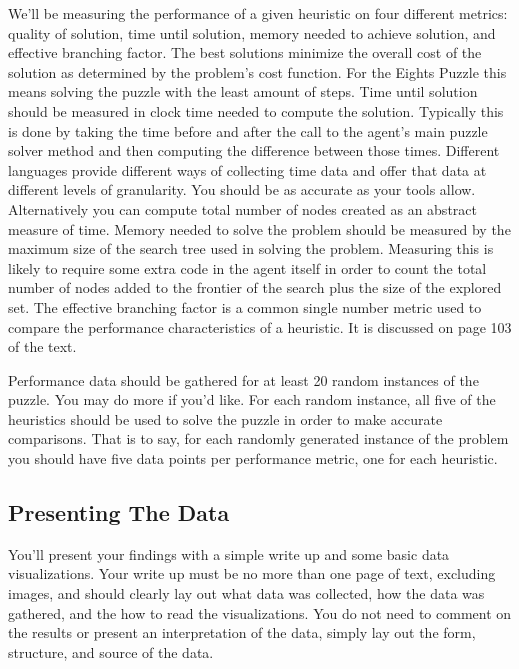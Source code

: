 \documentclass[nobib]{tufte-handout}
\begin{document}
We'll be measuring the performance of a given heuristic on four different metrics: quality of solution, time until solution, memory needed to achieve solution, and effective branching factor.  The best solutions minimize the overall cost of the solution as determined by the problem's cost function.  For the Eights Puzzle this means solving the puzzle with the least amount of steps. Time until solution should be measured in clock time needed to compute the solution. Typically this is done by taking the time before and after the call to the agent's main puzzle solver method and then computing the difference between those times. Different languages provide different ways of collecting time data and offer that data at different levels of granularity. You should be as accurate as your tools allow. Alternatively you can compute total number of nodes created as an abstract measure of time. Memory needed to solve the problem should be measured by the maximum size of the search tree used in solving the problem. Measuring this is likely to require some extra code in the agent itself in order to count the total number of nodes added to the frontier of the search plus the size of the explored set. The effective branching factor is a common single number metric used to compare the performance characteristics of a heuristic. It is discussed on page 103 of the text.

Performance data should be gathered for at least 20 random instances of the puzzle. You may do more if you'd like. For each random instance, all five of the heuristics should be used to solve the puzzle in order to make accurate comparisons. That is to say, for each randomly generated instance of the problem you should have five data points per performance metric, one for each heuristic.

\subsection{Presenting The Data}

You'll present your findings with a simple write up and some basic data visualizations. Your write up must be no more than one page of text, excluding images, and should clearly lay out what data was collected, how the data was gathered, and the how to read the visualizations.  You do not need to comment on the results or present an interpretation of the data, simply lay out the form, structure, and source of the data.
\end{document}
